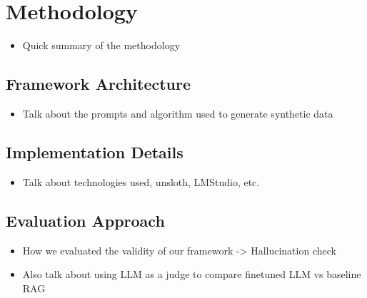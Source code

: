 \section{Methodology}

\begin{itemize}
  \item Quick summary of the methodology
\end{itemize}

\subsection{Framework Architecture}
\begin{itemize}
  \item Talk about the prompts and algorithm used to generate synthetic data
\end{itemize}

\subsection{Implementation Details}
\begin{itemize}
  \item Talk about technologies used, unsloth, LMStudio, etc.
\end{itemize}

\subsection{Evaluation Approach}
\begin{itemize}
  \item How we evaluated the validity of our framework -> Hallucination check
  \item Also talk about using LLM as a judge to compare finetuned LLM vs baseline RAG
\end{itemize}
